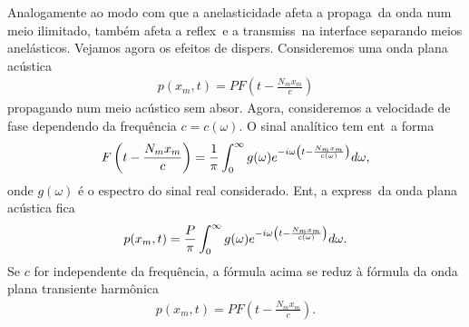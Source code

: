 Analogamente ao modo com que a anelasticidade afeta a propaga\cao\ da
onda num meio ilimitado, tamb\'em afeta a reflex\ao\ e a transmiss\ao\
na interface separando meios anel\'asticos. Vejamos agora os efeitos de
dispers\ao. Consideremos uma onda plana ac\'ustica
\begin{eqnarray}
p(x_m,t) = PF\left(t - \frac{N_m x_m}{c}\right)
\end{eqnarray}
propagando num meio ac\'ustico sem absor\cao. Agora, consideremos a
velocidade de fase dependendo da frequ\^encia $c = c(\omega)$. O sinal
anal\'itico tem ent\ao\ a forma
\begin{eqnarray}
F\left(t - \frac{N_m x_m}{c}\right) = 
\frac{1}{\pi}\int_{0}^{\infty} g(\omega)e^{-i\omega\left(t - \frac{N_m x_m}{c(\omega)} \right)}d\omega,
\end{eqnarray}
onde $g(\omega)$ \'e o espectro do sinal real considerado. Ent\ao, a
express\ao\ da onda plana ac\'ustica fica
\begin{eqnarray}
p(x_m,t) = \frac{P}{\pi}\int_{0}^{\infty} g(\omega)e^{-i\omega\left(t - \frac{N_m x_m}{c(\omega)} \right)}d\omega.
\end{eqnarray}
Se $c$ for independente da frequ\^encia, a f\'ormula acima se reduz \`a
f\'ormula da onda plana transiente harm\^onica
\begin{eqnarray}
p(x_m,t) = PF\left(t - \frac{N_m x_m}{c}\right).
\end{eqnarray}

